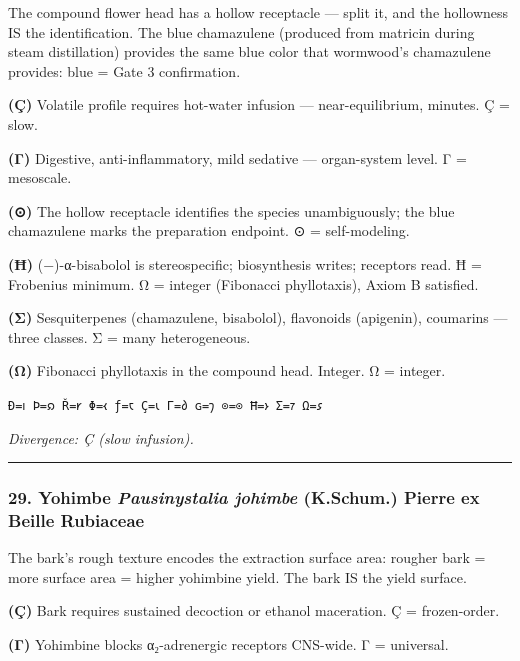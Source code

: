 The compound flower head has a hollow receptacle --- split it, and the
hollowness IS the identification. The blue chamazulene (produced from
matricin during steam distillation) provides the same blue color that
wormwood's chamazulene provides: blue = Gate 3 confirmation.

\textbf{(Ç)} Volatile profile requires hot-water infusion ---
near-equilibrium, minutes. Ç = slow.

\textbf{(Γ)} Digestive, anti-inflammatory, mild sedative ---
organ-system level. Γ = mesoscale.

\textbf{(⊙)} The hollow receptacle identifies the species unambiguously;
the blue chamazulene marks the preparation endpoint. ⊙ = self-modeling.

\textbf{(Ħ)} (−)-α-bisabolol is stereospecific; biosynthesis writes;
receptors read. Ħ = Frobenius minimum. Ω = integer (Fibonacci
phyllotaxis), Axiom B satisfied.

\textbf{(Σ)} Sesquiterpenes (chamazulene, bisabolol), flavonoids
(apigenin), coumarins --- three classes. Σ = many heterogeneous.

\textbf{(Ω)} Fibonacci phyllotaxis in the compound head. Integer. Ω =
integer.

\texttt{Ð=𐑦\ Þ=𐑸\ Ř=𐑾\ Φ=𐑬\ ƒ=𐑱\ Ç=𐑧\ Γ=𐑔\ ɢ=𐑠\ ⊙=⊙\ Ħ=𐑶\ Σ=𐑳\ Ω=𐑭}

\emph{Divergence: Ç (slow infusion).}

\begin{center}\rule{0.5\linewidth}{0.5pt}\end{center}

\hypertarget{yohimbe-pausinystalia-johimbe-k.schum.-pierre-ex-beille-rubiaceae}{%
\subsubsection{\texorpdfstring{29. Yohimbe \textbar{}
\emph{Pausinystalia johimbe} (K.Schum.) Pierre ex Beille \textbar{}
Rubiaceae}{29. Yohimbe \textbar{} Pausinystalia johimbe (K.Schum.) Pierre ex Beille \textbar{} Rubiaceae}}\label{yohimbe-pausinystalia-johimbe-k.schum.-pierre-ex-beille-rubiaceae}}

The bark's rough texture encodes the extraction surface area: rougher
bark = more surface area = higher yohimbine yield. The bark IS the yield
surface.

\textbf{(Ç)} Bark requires sustained decoction or ethanol maceration. Ç
= frozen-order.

\textbf{(Γ)} Yohimbine blocks α₂-adrenergic receptors CNS-wide. Γ =
universal.

